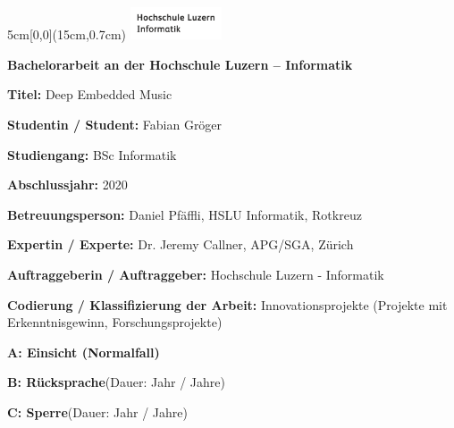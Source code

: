 
\begin{textblock*}{5cm}[0,0](15cm,0.7cm)
	\includegraphics[keepaspectratio,width=2.7cm]{img/HSLU_Logo_Header}
\end{textblock*}

\vspace{0.6cm}
\noindent
\textbf{\Large{Bachelorarbeit an der Hochschule Luzern – Informatik}}

\vspace{0.6cm}
\noindent
\textbf{Titel:} Deep Embedded Music

\vspace{0.6cm}
\noindent
\textbf{Studentin / Student:} Fabian Gröger

\vspace{0.6cm}
\noindent
\textbf{Studiengang:} BSc Informatik

\vspace{0.6cm}
\noindent
\textbf{Abschlussjahr:} 2020

\vspace{0.6cm}
\noindent
\textbf{Betreuungsperson:} Daniel Pfäffli, HSLU Informatik, Rotkreuz

\vspace{0.6cm}
\noindent
\textbf{Expertin / Experte:} Dr. Jeremy Callner, APG/SGA, Zürich

\vspace{0.6cm}
\noindent
\textbf{Auftraggeberin / Auftraggeber:} Hochschule Luzern - Informatik

\vspace*{1.00cm}

\noindent
\textbf{Codierung / Klassifizierung der Arbeit:} Innovationsprojekte (Projekte mit
Erkenntnisgewinn, Forschungsprojekte)

\begin{todolist}
	\item \textbf{A: Einsicht (Normalfall)}
	\item \textbf{B: Rücksprache}\hspace*{0.7cm}(Dauer:\hspace*{1cm} Jahr / Jahre)
	\item \textbf{C: Sperre}\hspace*{1.865cm}(Dauer:\hspace*{1cm} Jahr / Jahre)
\end{todolist}

